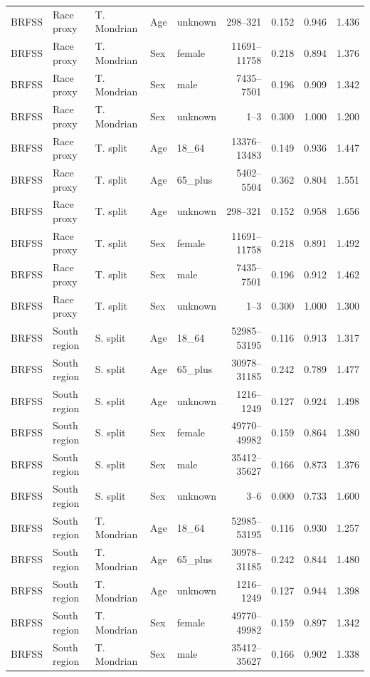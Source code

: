 \begin{longtable}{L{0.9cm}L{1.55cm}L{1.45cm}L{1.1cm}L{1.8cm}r r r r}
BRFSS & Race proxy & T. Mondrian & Age & unknown & 298--321 & 0.152 & 0.946 & 1.436 \\
BRFSS & Race proxy & T. Mondrian & Sex & female & 11691--11758 & 0.218 & 0.894 & 1.376 \\
BRFSS & Race proxy & T. Mondrian & Sex & male & 7435--7501 & 0.196 & 0.909 & 1.342 \\
BRFSS & Race proxy & T. Mondrian & Sex & unknown & 1--3 & 0.300 & 1.000 & 1.200 \\
BRFSS & Race proxy & T. split & Age & 18\_64 & 13376--13483 & 0.149 & 0.936 & 1.447 \\
BRFSS & Race proxy & T. split & Age & 65\_plus & 5402--5504 & 0.362 & 0.804 & 1.551 \\
BRFSS & Race proxy & T. split & Age & unknown & 298--321 & 0.152 & 0.958 & 1.656 \\
BRFSS & Race proxy & T. split & Sex & female & 11691--11758 & 0.218 & 0.891 & 1.492 \\
BRFSS & Race proxy & T. split & Sex & male & 7435--7501 & 0.196 & 0.912 & 1.462 \\
BRFSS & Race proxy & T. split & Sex & unknown & 1--3 & 0.300 & 1.000 & 1.300 \\
BRFSS & South region & S. split & Age & 18\_64 & 52985--53195 & 0.116 & 0.913 & 1.317 \\
BRFSS & South region & S. split & Age & 65\_plus & 30978--31185 & 0.242 & 0.789 & 1.477 \\
BRFSS & South region & S. split & Age & unknown & 1216--1249 & 0.127 & 0.924 & 1.498 \\
BRFSS & South region & S. split & Sex & female & 49770--49982 & 0.159 & 0.864 & 1.380 \\
BRFSS & South region & S. split & Sex & male & 35412--35627 & 0.166 & 0.873 & 1.376 \\
BRFSS & South region & S. split & Sex & unknown & 3--6 & 0.000 & 0.733 & 1.600 \\
BRFSS & South region & T. Mondrian & Age & 18\_64 & 52985--53195 & 0.116 & 0.930 & 1.257 \\
BRFSS & South region & T. Mondrian & Age & 65\_plus & 30978--31185 & 0.242 & 0.844 & 1.480 \\
BRFSS & South region & T. Mondrian & Age & unknown & 1216--1249 & 0.127 & 0.944 & 1.398 \\
BRFSS & South region & T. Mondrian & Sex & female & 49770--49982 & 0.159 & 0.897 & 1.342 \\
BRFSS & South region & T. Mondrian & Sex & male & 35412--35627 & 0.166 & 0.902 & 1.338 \\

\end{longtable}
